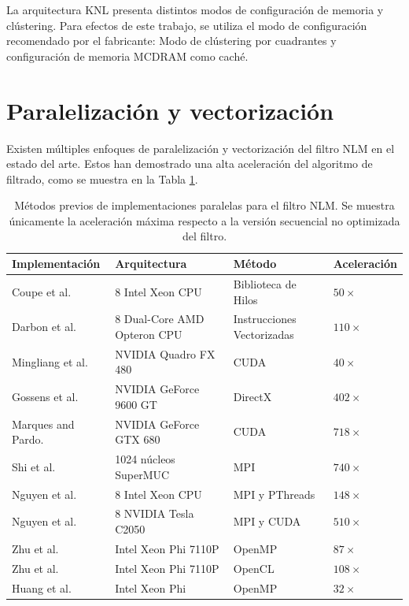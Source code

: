 La arquitectura KNL presenta distintos modos de configuración de memoria y clústering. Para efectos de este trabajo, se utiliza el modo de configuración recomendado por el fabricante: Modo de cl\'ustering por cuadrantes y configuración de memoria MCDRAM como caché.


\section{Paralelización y vectorización}
\label{ch:marco_parallel}

Existen múltiples enfoques de paralelización y vectorización del filtro NLM en el estado del arte. Estos han demostrado una alta aceleración del algoritmo de filtrado, como se muestra en la Tabla \ref{method_table}. 


\begin{table}[htb]
\caption[Estado del arte en paralelizaciones del filtro NLM]{Métodos previos de implementaciones paralelas para el filtro NLM. Se muestra únicamente la aceleración máxima respecto a la versión secuencial no optimizada del filtro.}
\begin{tabularx}{1\linewidth}{X X X X} 
\hline
Implementación & Arquitectura & Método & Aceleración \\ [0.5ex]
 \hline\hline
 Coupe et al. \cite{coupe2006fast} &  8 Intel Xeon CPU & Biblioteca de Hilos & $50\times$\\
 Darbon et al. \cite{Darbon2008} &  8 Dual-Core AMD Opteron CPU & Instrucciones Vectorizadas & $110\times$\\
 Mingliang et al. \cite{mingliang2016medical} &  NVIDIA Quadro FX 480 & CUDA & $40\times$\\
Gossens et al. \cite{goossens2010gpu} &  NVIDIA GeForce 9600 GT & DirectX & $402\times$\\
Marques and Pardo. \cite{marques2013implementation} &  NVIDIA GeForce GTX 680 & CUDA & $718\times$\\ 
Shi et al. \cite{shi2015optimized} &   1024 núcleos SuperMUC & MPI & $740\times$\\
Nguyen et al. \cite{nguyen2016medical} &   8 Intel Xeon CPU & MPI y PThreads & $148\times$\\
Nguyen et al. \cite{nguyen2016medical} &   8 NVIDIA Tesla C2050 & MPI y CUDA & $510\times$\\
Zhu et al. \cite{zhu2016parallel} &  Intel Xeon Phi 7110P & OpenMP & $87\times$\\
Zhu et al. \cite{zhu2016parallel} &  Intel Xeon Phi 7110P & OpenCL & $108\times$\\
Huang et al. \cite{huang2017parallel} &  Intel Xeon Phi & OpenMP & $32\times$\\
\end{tabularx}
\label{method_table}
\end{table}

